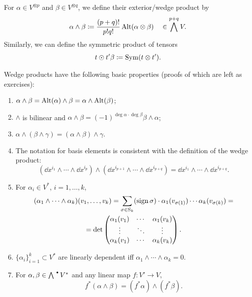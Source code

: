 \begin{defn}\label{def exterior and sym product}
    For $\alpha\in V^{\otimes p}$ and $\beta\in V^{\otimes q}$, we define their exterior/wedge product by
    \[\alpha\wedge\beta\coloneqq\frac{(p+q)!}{p!q!}\operatorname{Alt} (\alpha\otimes \beta)\quad \in \bigwedge^{p+q}V.\]
    Similarly, we can define the symmetric product of tensors 
    \[t\odot t'\beta\coloneqq\operatorname{Sym}(t\otimes t').\]
\end{defn}
Wedge products have the following basic properties (proofs of which are left as exercises):
\begin{enumerate}
    \item $\alpha\wedge\beta=\operatorname{Alt}(\alpha)\wedge\beta=\alpha\wedge\operatorname{Alt}(\beta)$;
    \item $\wedge$ is bilinear and $\alpha\wedge\beta=(-1)^{\deg\alpha\cdot\deg\beta}\beta\wedge\alpha$;
    \item $\alpha\wedge(\beta\wedge\gamma)=(\alpha\wedge\beta)\wedge\gamma$.
    \item The notation for basis elements is consistent with the definition of the wedge product:
    \[(\dd x^{i_1}\wedge\cdots\wedge \dd x^{i_p})\wedge (\dd x^{i_{p+1}}\wedge\cdots\wedge \dd x^{i_{p+q}})=\dd x^{i_1}\wedge\cdots\wedge \dd x^{i_{p+q}}.\]
    \item For $\alpha_i\in V^\ast$, $i=1,\ldots,k$, 
    \begin{multline}
        (\alpha_1\wedge\cdots\wedge\alpha_k)(v_1,\ldots,v_k)=\sum_{\sigma\in \mathrm{S}_k}(\operatorname{sign}\sigma)\cdot \alpha_1(v_{\sigma(1)})\cdots\alpha_k(v_{\sigma(k)})=\\
        =\det \begin{pmatrix}
         \alpha_1(v_1) & \cdots & \alpha_1(v_k)  \\
         \vdots & \ddots & \vdots \\
         \alpha_k(v_1) & \cdots & \alpha_k(v_k) 
    \end{pmatrix}.\label{form determinant f-la}
    \end{multline}
    \item $\{\alpha_i\}_{i=1}^k\subset V^\ast$ are linearly dependent iff $\alpha_1\wedge\cdots\wedge\alpha_k=0$.
    \item For $\alpha,\beta\in\bigwedge^{\smbullet } V^\ast$ and any linear map $f:V'\to V$,
    \[f^\ast(\alpha\wedge\beta)=(f^\ast\alpha)\wedge(f^\ast\beta).\label{pullbacks of wedges}\]
\end{enumerate}

